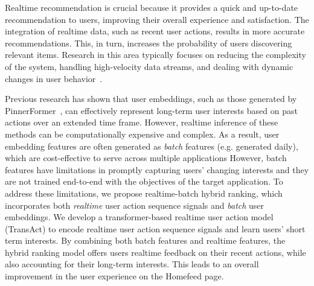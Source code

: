 Realtime recommendation is crucial because it provides a quick and up-to-date recommendation to users, improving their overall experience and satisfaction. 
The integration of realtime data, such as recent user actions, results in more accurate recommendations. This, in turn, increases the probability of users discovering relevant items. 
Research in this area typically focuses on reducing the complexity of the system\cite{chatzopoulos2016readme}, handling high-velocity data streams\cite{6542425}, and dealing with dynamic changes in user behavior~\cite{grbovic2018real, 10.1145/2699670}. 

Previous research has shown that user embeddings, such as those generated by PinnerFormer~\cite{pinnerformer}, can effectively represent long-term user interests based on past actions over an extended time frame. However, realtime inference of these methods can be computationally expensive and complex.
As a result, user embedding features are often generated as \textit{batch} features (e.g. generated daily), which are cost-effective to serve across multiple applications
However, batch features have limitations in promptly capturing users' changing interests and they are not trained end-to-end with the objectives of the target application.
To address these limitations, we propose realtime-batch hybrid ranking, which incorporates both \textit{realtime} user action sequence signals and \textit{batch} user embeddings. 
We develop a transformer-based realtime user action model (TransAct) to encode realtime user action sequence signals and learn users' short term interests. 
By combining both batch features and realtime features, the hybrid ranking model offers users realtime feedback on their recent actions, while also accounting for their long-term interests. This leads to an overall improvement in the user experience on the Homefeed page.


